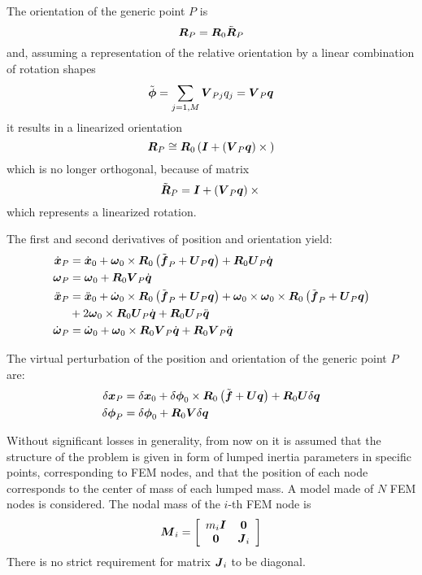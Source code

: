 The orientation of the generic point $P$ is
\begin{equation}
	\T{R}_P = \T{R}_0 \tilde{\T{R}}_P
\end{equation}
and, assuming a representation of the relative orientation by a linear
combination of rotation shapes
\begin{equation}
	\tilde{\T{\phi}} = \sum_{j=1,M} \T{V}_{Pj} q_j = \T{V}_P \T{q}
\end{equation}
it results in a linearized orientation
\begin{equation}
	\T{R}_P \cong \T{R}_0 \plbr{\T{I} + \plbr{\T{V}_P \T{q}}\times{}}
\end{equation}
which is no longer orthogonal, because of matrix
\begin{equation}
	\tilde{\T{R}}_P = \T{I} + \plbr{\T{V}_P \T{q}}\times{}
\end{equation}
which represents a linearized rotation.

The first and second derivatives of position and orientation yield:
\begin{align}
	\dot{\T{x}}_P &= \dot{\T{x}}_0
		+ \T{\omega}_0 \times \T{R}_0 \plbr{\tilde{\T{f}}_P + \T{U}_P \T{q}}
		+ \T{R}_0 \T{U}_P \dot{\T{q}} \\
	\T{\omega}_P &= \T{\omega}_0
		+ \T{R}_0 \T{V}_P \dot{\T{q}} \\
	\ddot{\T{x}}_P &= \ddot{\T{x}}_0
		+ \dot{\T{\omega}}_0 \times \T{R}_0 \plbr{\tilde{\T{f}}_P + \T{U}_P \T{q}}
		+ \T{\omega}_0 \times \T{\omega}_0 \times \T{R}_0 \plbr{\tilde{\T{f}}_P + \T{U}_P \T{q}} \nonumber \\
		& \mbox{} + 2 \T{\omega}_0 \times \T{R}_0 \T{U}_P \dot{\T{q}}
		+ \T{R}_0 \T{U}_P \ddot{\T{q}} \\
	\dot{\T{\omega}}_P &= \dot{\T{\omega}}_0
		+ \T{\omega}_0 \times \T{R}_0 \T{V}_P \dot{\T{q}}
		+ \T{R}_0 \T{V}_P \ddot{\T{q}}
\end{align}

The virtual perturbation of the position and orientation
of the generic point $P$ are:
\begin{align}
	\delta{\T{x}}_P &= \delta{\T{x}}_0
		+ \delta\T{\phi}_0 \times \T{R}_0 \plbr{\tilde{\T{f}} + \T{U} \T{q}}
		+ \T{R}_0 \T{U} \delta{\T{q}} \\
	\delta\T{\phi}_P &= \delta\T{\phi}_0
		+ \T{R}_0 \T{V} \delta{\T{q}}
\end{align}

Without significant losses in generality, from now on it is assumed
that the structure of the problem is given in form of lumped inertia
parameters in specific points, corresponding to FEM nodes,
and that the position of each node corresponds to the center of mass
of each lumped mass.
A model made of $N$ FEM nodes is considered.
The nodal mass of the $i$-th FEM node is
\begin{equation}
	\T{M}_i = \sqbr{\matr{cc}{
		m_i \T{I} & \T{0} \\
		\T{0} & \T{J}_i
	}}
\end{equation}
There is no strict requirement for matrix $\T{J}_i$ to be diagonal.

